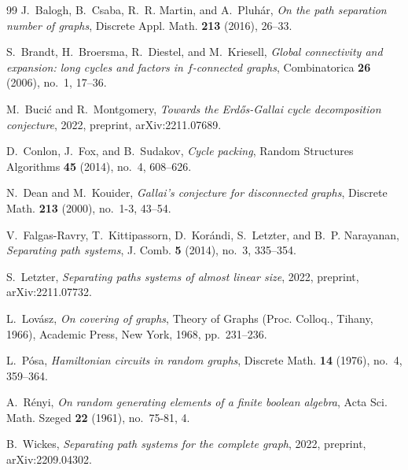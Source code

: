 \documentclass[11pt]{article}
\begin{document}

\begin{thebibliography}{99}
J.~Balogh, B.~Csaba, R.~R. Martin, and A.~Pluh\'{a}r, \emph{On the path
  separation number of graphs}, Discrete Appl. Math. \textbf{213} (2016),
  26--33.

S.~Brandt, H.~Broersma, R.~Diestel, and M.~Kriesell, \emph{Global connectivity
  and expansion: long cycles and factors in {$f$}-connected graphs},
  Combinatorica \textbf{26} (2006), no.~1, 17--36.

M.~Buci{\'c} and R.~Montgomery, \emph{Towards the {E}rd{\H{o}}s-{G}allai cycle
  decomposition conjecture}, 2022, preprint, arXiv:2211.07689.

D.~Conlon, J.~Fox, and B.~Sudakov, \emph{Cycle packing}, Random Structures
  Algorithms \textbf{45} (2014), no.~4, 608--626.

N.~Dean and M.~Kouider, \emph{Gallai's conjecture for disconnected graphs},
  Discrete Math. \textbf{213} (2000), no.~1-3, 43--54.

V.~Falgas-Ravry, T.~Kittipassorn, D.~Kor\'{a}ndi, S.~Letzter, and B.~P.
  Narayanan, \emph{Separating path systems}, J. Comb. \textbf{5} (2014), no.~3,
  335--354.

S.~Letzter, \emph{Separating paths systems of almost linear size}, 2022,
  preprint, arXiv:2211.07732.

L.~Lov\'{a}sz, \emph{On covering of graphs}, Theory of {G}raphs ({P}roc.
  {C}olloq., {T}ihany, 1966), Academic Press, New York, 1968, pp.~231--236.

L.~P\'{o}sa, \emph{Hamiltonian circuits in random graphs}, Discrete Math.
  \textbf{14} (1976), no.~4, 359--364.

A.~R{\'e}nyi, \emph{On random generating elements of a finite boolean algebra},
  Acta Sci. Math. Szeged \textbf{22} (1961), no.~75-81, 4.

B.~Wickes, \emph{Separating path systems for the complete graph}, 2022,
  preprint, arXiv:2209.04302.

\end{thebibliography}
\end{document}
